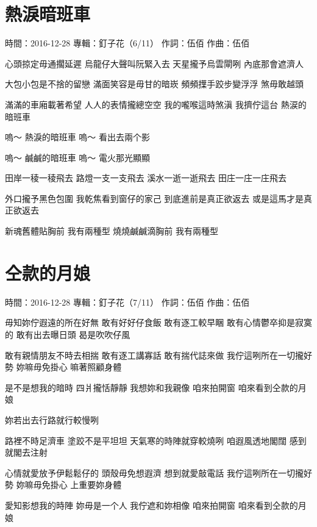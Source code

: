 \documentclass[UTF8,a4paper,oneside,twocolumn,12pt]{ctexbook}
\newcommand{\infopair}[2]{\textbullet #1：#2}
\newcommand{\zc}[1][伍佰]{\infopair{作詞}{#1}}
\newcommand{\zq}[1][伍佰]{\infopair{作曲}{#1}}
\newcommand{\zj}[1]{\infopair{專輯}{#1}}
\newcommand{\sj}[1]{\infopair{時間}{#1}}
\newenvironment{info}{\begin{flushleft}\kaishu
	}
	{\end{flushleft}\normalsize\yahei\par}
\newenvironment{lyric}{
	}
{}
\begin{document}
\section{熱淚暗班車}
\begin{info}
	\sj{2016-12-28}
	\zj{釘子花（6/11）}
	\zc
	\zq
\end{info}
\begin{lyric}
	心頭掠定毋通擱延遲
	烏龍仔大聲叫阮緊入去
	天星攏予烏雲閘咧
	內底那會遮濟人

	大包小包是不捨的留戀
	滿面笑容是毋甘的暗崁
	頻頻擛手跤步變浮浮
	煞毋敢越頭

	滿滿的車廂載著希望
	人人的表情攏總空空
	我的嚨喉這時煞滇
	我擠佇這台 熱涙的暗班車

	嗚～ 熱淚的暗班車
	嗚～ 看出去兩个影

	嗚～ 鹹鹹的暗班車
	嗚～ 電火那光顯顯

	田岸一稜一稜飛去
	路燈一支一支飛去
	溪水一逝一逝飛去
	田庄一庄一庄飛去

	外口攏予黑色包圍
	我乾焦看到窗仔的家己
	到底進前是真正欲返去
	或是這馬才是真正欲返去

	新魂舊體貼胸前 我有兩種型
	燒燒鹹鹹滴胸前 我有兩種型
\end{lyric}

\section{仝款的月娘}
\begin{info}
	\sj{2016-12-28}
	\zj{釘子花（7/11）}
	\zc
	\zq
\end{info}
\begin{lyric}
	毋知妳佇遐遠的所在好無
	敢有好好仔食飯 敢有逐工較早睏
	敢有心情鬱卒抑是寂寞的
	敢有出去曝日頭 曷是吹吹仔風

	敢有親情朋友不時去相揣
	敢有逐工講寡話 敢有揣代誌來做
	我佇這咧所在一切攏好勢
	妳嘛毋免掛心 嘛著照顧身體

	是不是想我的暗時 四爿攏恬靜靜
	我想妳和我親像
	咱來拍開窗
	咱來看到仝款的月娘

	妳若出去行路就行較慢咧

	路裡不時足濟車 塗跤不是平坦坦
	天氣寒的時陣就穿較燒咧
	咱遐風透地閣闊 感到就閣去注射

	心情就愛放予伊鬆鬆仔的
	頭殼毋免想遐濟 想到就愛敲電話
	我佇這咧所在一切攏好勢
	妳嘛毋免掛心 上重要妳身體

	愛知影想我的時陣 妳毋是一个人
	我佇遮和妳相像
	咱來拍開窗
	咱來看到仝款的月娘
\end{lyric}
\end{document}
